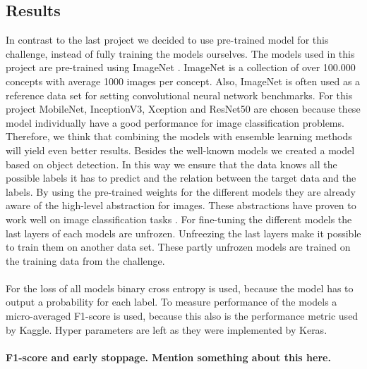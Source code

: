 \documentclass[10pt, a4paper]{article}
\begin{document}
\begin{multicols}{2}
		\section{Results}
		In contrast to the last project we decided to use pre-trained model for this challenge, instead of fully training the models ourselves. The models used in this project are pre-trained using ImageNet \cite{deng2009imagenet}. ImageNet is a collection of over 100.000 concepts with average 1000 images per concept. Also, ImageNet is often used as a reference data set for setting convolutional neural network benchmarks. For this project MobileNet, InceptionV3, Xception and ResNet50 are chosen because these model individually have a good performance for image classification problems. Therefore, we think that combining the models with ensemble learning methods will yield even better results. Besides the well-known models we created a model based on object detection. In this way we ensure that the data knows all the possible labels it has to predict and the relation between the target data and the labels. By using the pre-trained weights for the different models they are already aware of the high-level abstraction for images. These abstractions have proven to work well on image classification tasks \cite{razavian2014cnn}.
		For fine-tuning the different models the last layers of each models are unfrozen. Unfreezing the last layers make it possible to train them on another data set. These partly unfrozen models are trained on the training data from the challenge.
		\\
		\\
		For the loss of all models binary cross entropy is used, because the model has to output a probability for each label. To measure performance of the models a micro-averaged F1-score is used, because this also is the performance metric used by Kaggle. Hyper parameters are left as they were implemented by Keras.
		\\
		\\
		\textbf{F1-score and early stoppage. Mention something about this here.}


\end{multicols}
\end{document}
